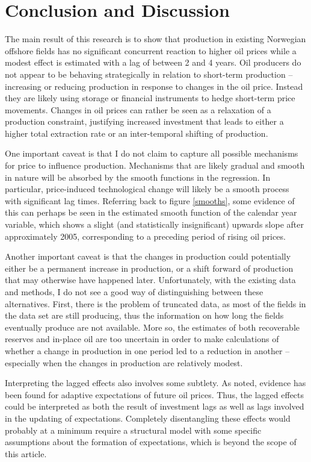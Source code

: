 \documentclass[12pt]{article}
\begin{document}
\section{Conclusion and Discussion}

The main result of this research is to show that production in existing Norwegian offshore fields has no significant concurrent reaction to higher oil prices while a modest effect is estimated  with a lag of between 2 and 4 years.  Oil producers do not appear to be behaving strategically in relation to short-term production -- increasing or reducing production in response to changes in the oil price.  Instead they are likely using storage or financial instruments to hedge short-term price movements. Changes in oil prices can rather be seen as a relaxation of a production constraint, justifying increased investment that leads to either a higher total extraction rate or an inter-temporal shifting of production.

One important caveat is that I do not claim to capture all possible mechanisms for price to influence production.  Mechanisms that are likely gradual and smooth in nature will be absorbed by the smooth functions in the regression. In particular, price-induced technological change will likely be a smooth process with significant lag times. Referring back to figure \ref{smooths}, some evidence of this can perhaps be seen in the estimated smooth function of the calendar year variable, which shows a slight (and statistically insignificant) upwards slope after approximately 2005, corresponding to a preceding period of rising oil prices.   

Another important caveat is that the changes in production could potentially either be a permanent increase in production, or a shift forward of production that may otherwise have happened later. Unfortunately, with the existing data and methods, I do not see a good way of distinguishing between these alternatives. First, there is the problem of truncated data, as most of the fields in the data set are still producing, thus the information on how long the fields eventually produce are not available.  More so, the estimates of both recoverable reserves and in-place oil are too uncertain in order to make calculations of whether a change in production in one period led to a reduction in another -- especially when the changes in production are relatively modest.

Interpreting the lagged effects also involves some subtlety. As noted, evidence has been found for adaptive expectations of future oil prices.  Thus, the lagged effects could be interpreted as both the result of investment lags as well as lags involved in the updating of expectations. Completely disentangling these effects would probably at a minimum require a structural model with some specific assumptions about the formation of expectations, which is beyond the scope of this article. 
\end{document}
